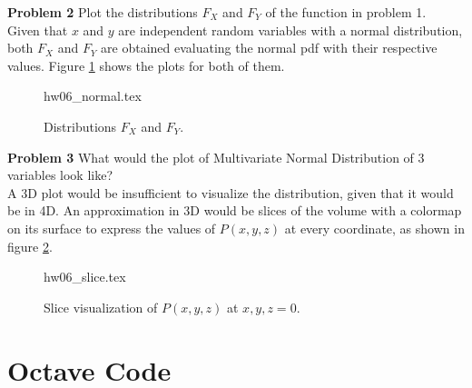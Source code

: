 \documentclass[a4paper,12pt]{article}
\begin{document}
\pagebreak

\textbf{Problem 2}
Plot the distributions $F_X$ and $F_Y$ of the function in problem 1.\\

Given that $x$ and $y$ are independent random variables with a normal distribution, both $F_X$ and $F_Y$ are obtained evaluating the normal pdf with their respective values.
Figure \ref{fig: normal} shows the plots for both of them.

\begin{figure}[htb!]
\centering
{hw06_normal.tex}
\caption{Distributions $F_X$ and $F_Y$.}
\label{fig: normal}
\end{figure}

\pagebreak
\textbf{Problem 3}
What would the plot of Multivariate Normal Distribution of 3 variables look like?\\

A 3D plot would be insufficient to visualize the distribution, given that it would be in 4D.
An approximation in 3D would be slices of the volume with a colormap on its surface to express the values of $P(x, y, z)$ at every coordinate, as shown in figure \ref{fig: slice}.

\begin{figure}[htb!]
\centering
{hw06_slice.tex}
\caption{Slice visualization of $P(x, y, z)$ at $x, y, z = 0$.}
\label{fig: slice}
\end{figure}


\pagebreak

\printbibliography

\pagebreak
\appendix
\section{Octave Code}

\end{document}
